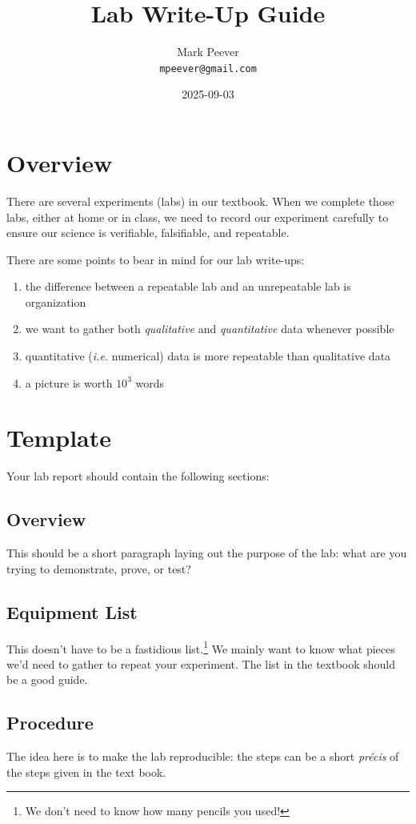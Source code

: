 \documentclass[12pt, oneside]{article}   	%
\title{Lab Write-Up Guide}
\author{Mark Peever\\ \texttt{mpeever@gmail.com}}
\date{2025-09-03}
\begin{document}
\maketitle

\section{Overview}
There are several experiments (labs) in our textbook. When we complete those labs, either at home or in class, we need to record our experiment carefully to ensure our science is verifiable, falsifiable, and repeatable. 

There are some points to bear in mind for our lab write-ups:
\begin{enumerate}
\item the difference between a repeatable lab and an unrepeatable lab is organization
\item we want to gather both \emph{qualitative} and \emph{quantitative} data whenever possible
\item quantitative (\emph{i.e.} numerical) data is  more repeatable than qualitative data
\item a picture is worth $10^{3}$ words
\end{enumerate}

\section{Template}
Your lab report should contain the following sections:

\subsection{Overview}
This should be a short paragraph laying out the purpose of the lab: what are you trying to demonstrate, prove, or test?

\subsection{Equipment List}
This doesn't have to be a fastidious list.\footnote{We don't need to know how many pencils you used!} We mainly want to know what pieces we'd need to gather to repeat your experiment. The list in the textbook should be a good guide.

\subsection{Procedure}
The idea here is to make the lab reproducible: the steps can be a short \emph{pr\'{e}cis} of the steps given in the text book.
\end{document}
